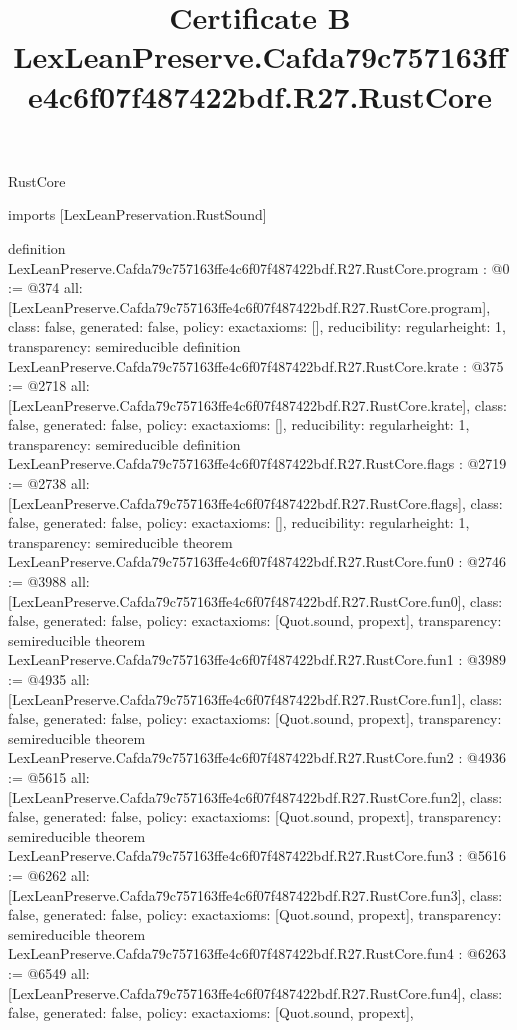 \begin{lexlean}{RustCore}
\title{Certificate B LexLeanPreserve.Cafda79c757163ffe4c6f07f487422bdf.R27.RustCore}
\begin{coremodule}
imports [LexLeanPreservation.RustSound]

definition LexLeanPreserve.Cafda79c757163ffe4c6f07f487422bdf.R27.RustCore.program : @0 := @374 {
  all: [LexLeanPreserve.Cafda79c757163ffe4c6f07f487422bdf.R27.RustCore.program],
  class: false,
  generated: false,
  policy: exact{axioms: []},
  reducibility: regular{height: 1},
  transparency: semireducible
}
definition LexLeanPreserve.Cafda79c757163ffe4c6f07f487422bdf.R27.RustCore.krate : @375 := @2718 {
  all: [LexLeanPreserve.Cafda79c757163ffe4c6f07f487422bdf.R27.RustCore.krate],
  class: false,
  generated: false,
  policy: exact{axioms: []},
  reducibility: regular{height: 1},
  transparency: semireducible
}
definition LexLeanPreserve.Cafda79c757163ffe4c6f07f487422bdf.R27.RustCore.flags : @2719 := @2738 {
  all: [LexLeanPreserve.Cafda79c757163ffe4c6f07f487422bdf.R27.RustCore.flags],
  class: false,
  generated: false,
  policy: exact{axioms: []},
  reducibility: regular{height: 1},
  transparency: semireducible
}
theorem LexLeanPreserve.Cafda79c757163ffe4c6f07f487422bdf.R27.RustCore.fun0 : @2746 := @3988 {
  all: [LexLeanPreserve.Cafda79c757163ffe4c6f07f487422bdf.R27.RustCore.fun0],
  class: false,
  generated: false,
  policy: exact{axioms: [Quot.sound, propext]},
  transparency: semireducible
}
theorem LexLeanPreserve.Cafda79c757163ffe4c6f07f487422bdf.R27.RustCore.fun1 : @3989 := @4935 {
  all: [LexLeanPreserve.Cafda79c757163ffe4c6f07f487422bdf.R27.RustCore.fun1],
  class: false,
  generated: false,
  policy: exact{axioms: [Quot.sound, propext]},
  transparency: semireducible
}
theorem LexLeanPreserve.Cafda79c757163ffe4c6f07f487422bdf.R27.RustCore.fun2 : @4936 := @5615 {
  all: [LexLeanPreserve.Cafda79c757163ffe4c6f07f487422bdf.R27.RustCore.fun2],
  class: false,
  generated: false,
  policy: exact{axioms: [Quot.sound, propext]},
  transparency: semireducible
}
theorem LexLeanPreserve.Cafda79c757163ffe4c6f07f487422bdf.R27.RustCore.fun3 : @5616 := @6262 {
  all: [LexLeanPreserve.Cafda79c757163ffe4c6f07f487422bdf.R27.RustCore.fun3],
  class: false,
  generated: false,
  policy: exact{axioms: [Quot.sound, propext]},
  transparency: semireducible
}
theorem LexLeanPreserve.Cafda79c757163ffe4c6f07f487422bdf.R27.RustCore.fun4 : @6263 := @6549 {
  all: [LexLeanPreserve.Cafda79c757163ffe4c6f07f487422bdf.R27.RustCore.fun4],
  class: false,
  generated: false,
  policy: exact{axioms: [Quot.sound, propext]},
}
\end{coremodule}
\end{lexlean}
